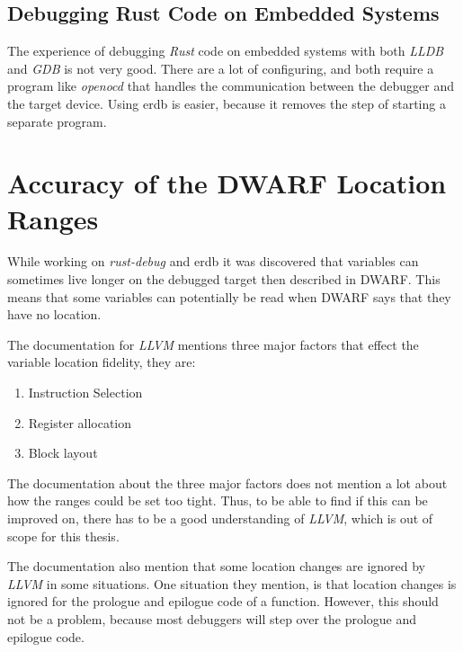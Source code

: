 \subsection{Debugging Rust Code on Embedded Systems}
The experience of debugging \emph{Rust} code on embedded systems with both \emph{LLDB} and \emph{GDB} is not very good.
There are a lot of configuring, and both require a program like \emph{openocd} that handles the communication between the debugger and the target device.
Using \gls{erdb} is easier, because it removes the step of starting a separate program.


\section{Accuracy of the DWARF Location Ranges}\label{section:loc-ranges}
While working on \emph{rust-debug} and \gls{erdb} it was discovered that variables can sometimes live longer on the debugged target then described in \gls{DWARF}.
This means that some variables can potentially be read when \gls{DWARF} says that they have no location.


The documentation for \emph{LLVM} \cite{llvm-dbs} mentions three major factors that effect the variable location fidelity, they are:

\begin{enumerate}
  \item Instruction Selection
  \item Register allocation
  \item Block layout
\end{enumerate}

The documentation about the three major factors does not mention a lot about how the ranges could be set too tight.
Thus, to be able to find if this can be improved on, there has to be a good understanding of \emph{LLVM}, which is out of scope for this thesis.


The documentation also mention that some location changes are ignored by \emph{LLVM} in some situations.
One situation they mention, is that location changes is ignored for the prologue and epilogue code of a function.
However, this should not be a problem, because most debuggers will step over the prologue and epilogue code.

